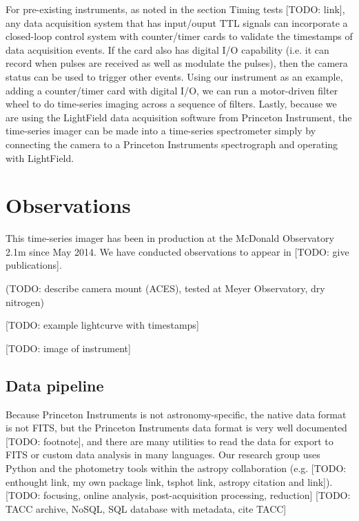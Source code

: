 \documentclass[preprint2]{aastex}
\begin{document}
For pre-existing instruments, as noted in the section Timing tests [TODO: link], any data acquisition system that has input/ouput TTL signals can incorporate a closed-loop control system with counter/timer cards to validate the timestamps of data acquisition events. If the card also has digital I/O capability (i.e. it can record when pulses are received as well as modulate the pulses), then the camera status can be used to trigger other events. Using our instrument as an example, adding a counter/timer card with digital I/O, we can run a motor-driven filter wheel to do time-series imaging across a sequence of filters. Lastly, because we are using the LightField data acquisition software from Princeton Instrument, the time-series imager can be made into a time-series spectrometer simply by connecting the camera to a Princeton Instruments spectrograph and operating with LightField.

\section{Observations}

This time-series imager has been in production at the McDonald Observatory 2.1m since May 2014. We have conducted observations to appear in [TODO: give publications].

(TODO: describe camera mount (ACES),
tested at Meyer Observatory, dry nitrogen)

[TODO: example lightcurve with timestamps]

[TODO: image of instrument]

\subsection{Data pipeline}

Because Princeton Instruments is not astronomy-specific, the native data format is not FITS, but the Princeton Instruments data format is very well documented [TODO: footnote], and there are many utilities to read the data for export to FITS or custom data analysis in many languages. Our research group uses Python and the photometry tools within the astropy collaboration (e.g. [TODO: enthought link, my own package link, tsphot link, astropy citation and link]). [TODO: focusing, online analysis, post-acquisition processing, reduction] [TODO: TACC archive, NoSQL, SQL database with metadata, cite TACC]

\end{document}

